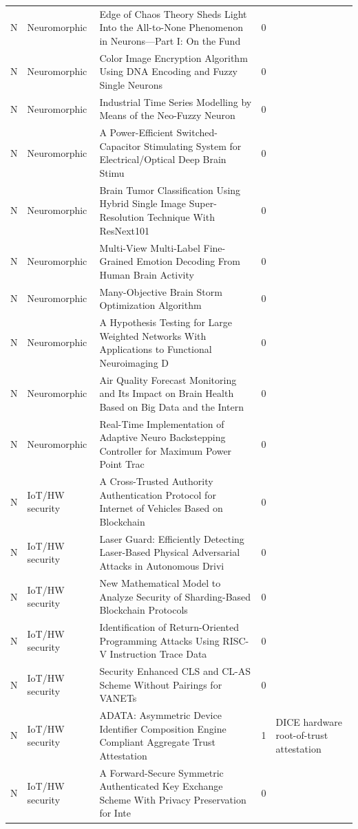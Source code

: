 \documentclass[10pt]{article}
\begin{document}
\begin{longtable}{@{}llL{8.6cm}lL{4.2cm}@{}}
N & Neuromorphic & Edge of Chaos Theory Sheds Light Into the All-to-None Phenomenon in Neurons—Part I: On the Fund & 0 &  \\
N & Neuromorphic & Color Image Encryption Algorithm Using DNA Encoding and Fuzzy Single Neurons & 0 &  \\
N & Neuromorphic & Industrial Time Series Modelling by Means of the Neo-Fuzzy Neuron & 0 &  \\
N & Neuromorphic & A Power-Efficient Switched-Capacitor Stimulating System for Electrical/Optical Deep Brain Stimu & 0 &  \\
N & Neuromorphic & Brain Tumor Classification Using Hybrid Single Image Super-Resolution Technique With ResNext101 & 0 &  \\
N & Neuromorphic & Multi-View Multi-Label Fine-Grained Emotion Decoding From Human Brain Activity & 0 &  \\
N & Neuromorphic & Many-Objective Brain Storm Optimization Algorithm & 0 &  \\
N & Neuromorphic & A Hypothesis Testing for Large Weighted Networks With Applications to Functional Neuroimaging D & 0 &  \\
N & Neuromorphic & Air Quality Forecast Monitoring and Its Impact on Brain Health Based on Big Data and the Intern & 0 &  \\
N & Neuromorphic & Real-Time Implementation of Adaptive Neuro Backstepping Controller for Maximum Power Point Trac & 0 &  \\
N & IoT/HW security & A Cross-Trusted Authority Authentication Protocol for Internet of Vehicles Based on Blockchain & 0 &  \\
N & IoT/HW security & Laser Guard: Efficiently Detecting Laser-Based Physical Adversarial Attacks in Autonomous Drivi & 0 &  \\
N & IoT/HW security & New Mathematical Model to Analyze Security of Sharding-Based Blockchain Protocols & 0 &  \\
N & IoT/HW security & Identification of Return-Oriented Programming Attacks Using RISC-V Instruction Trace Data & 0 &  \\
N & IoT/HW security & Security Enhanced CLS and CL-AS Scheme Without Pairings for VANETs & 0 &  \\
N & IoT/HW security & ADATA: Asymmetric Device Identifier Composition Engine Compliant Aggregate Trust Attestation & 1 & DICE hardware root-of-trust attestation \\
N & IoT/HW security & A Forward-Secure Symmetric Authenticated Key Exchange Scheme With Privacy Preservation for Inte & 0 &  \\

\end{longtable}
\end{document}
